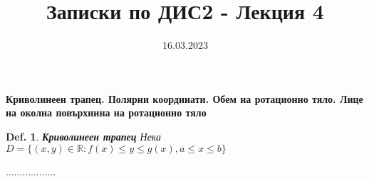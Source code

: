 \documentclass[12pt]{article}
\newtheorem{definition}{Def.}
\begin{document}
	\color{white}
	\pagecolor{darkgray}
	\title{Записки по ДИС2 - Лекция 4}
	\date{16.03.2023}
	\maketitle
	\begin{center}
		\Large
		\textbf{Криволинеен трапец. Полярни координати. Обем на ротационно тяло. Лице на околна повърхнина на ротационно тяло}
	\end{center}

	\begin{definition} \textbf{\textit{Криволинеен трапец}}
		Нека $D = \{(x,y)\in \mathbb{R}: f(x)\leq y\leq g(x), a \leq x \leq b\}$
	\end{definition}
	..................
	
\end{document}
